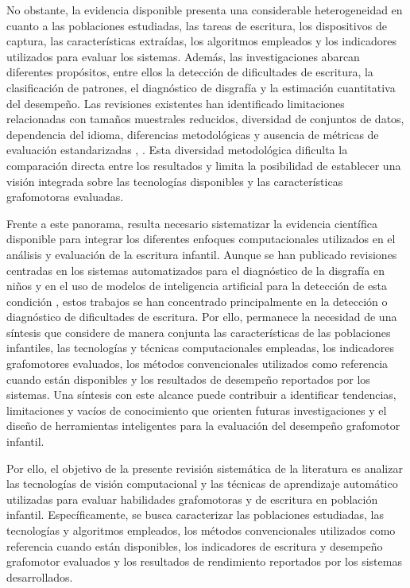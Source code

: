 \documentclass{iaesarticle}
\begin{document}
No obstante, la evidencia disponible presenta una considerable heterogeneidad en cuanto a las poblaciones estudiadas, las tareas de escritura, los dispositivos de captura, las características extraídas, los algoritmos empleados y los indicadores utilizados para evaluar los sistemas. Además, las investigaciones abarcan diferentes propósitos, entre ellos la detección de dificultades de escritura, la clasificación de patrones, el diagnóstico de disgrafía y la estimación cuantitativa del desempeño. Las revisiones existentes han identificado limitaciones relacionadas con tamaños muestrales reducidos, diversidad de conjuntos de datos, dependencia del idioma, diferencias metodológicas y ausencia de métricas de evaluación estandarizadas \cite{Kunhoth2024}, \cite{Fallah2025}. Esta diversidad metodológica dificulta la comparación directa entre los resultados y limita la posibilidad de establecer una visión integrada sobre las tecnologías disponibles y las características grafomotoras evaluadas.

Frente a este panorama, resulta necesario sistematizar la evidencia científica disponible para integrar los diferentes enfoques computacionales utilizados en el análisis y evaluación de la escritura infantil. Aunque se han publicado revisiones centradas en los sistemas automatizados para el diagnóstico de la disgrafía en niños \cite{Kunhoth2024} y en el uso de modelos de inteligencia artificial para la detección de esta condición \cite{Fallah2025}, estos trabajos se han concentrado principalmente en la detección o diagnóstico de dificultades de escritura. Por ello, permanece la necesidad de una síntesis que considere de manera conjunta las características de las poblaciones infantiles, las tecnologías y técnicas computacionales empleadas, los indicadores grafomotores evaluados, los métodos convencionales utilizados como referencia cuando están disponibles y los resultados de desempeño reportados por los sistemas. Una síntesis con este alcance puede contribuir a identificar tendencias, limitaciones y vacíos de conocimiento que orienten futuras investigaciones y el diseño de herramientas inteligentes para la evaluación del desempeño grafomotor infantil.

Por ello, el objetivo de la presente revisión sistemática de la literatura es analizar las tecnologías de visión computacional y las técnicas de aprendizaje automático utilizadas para evaluar habilidades grafomotoras y de escritura en población infantil. Específicamente, se busca caracterizar las poblaciones estudiadas, las tecnologías y algoritmos empleados, los métodos convencionales utilizados como referencia cuando están disponibles, los indicadores de escritura y desempeño grafomotor evaluados y los resultados de rendimiento reportados por los sistemas desarrollados.
\end{document}

